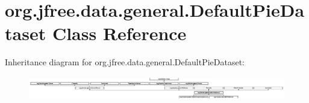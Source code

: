 \hypertarget{classorg_1_1jfree_1_1data_1_1general_1_1_default_pie_dataset}{}\section{org.\+jfree.\+data.\+general.\+Default\+Pie\+Dataset Class Reference}
\label{classorg_1_1jfree_1_1data_1_1general_1_1_default_pie_dataset}
Inheritance diagram for org.\+jfree.\+data.\+general.\+Default\+Pie\+Dataset\+:\begin{figure}[H]
\begin{center}
\leavevmode
\includegraphics[height=1.020036cm]{classorg_1_1jfree_1_1data_1_1general_1_1_default_pie_dataset}
\end{center}
\end{figure}
